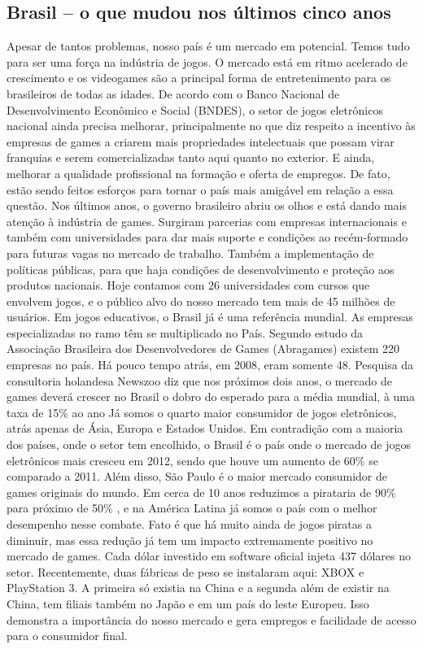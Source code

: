 \subsection{Brasil – o que mudou nos últimos cinco anos}
%
Apesar de tantos problemas, nosso país é um mercado em potencial. Temos tudo para ser uma força na indústria de jogos. O mercado está em ritmo acelerado de crescimento e os videogames são a principal forma de entretenimento para os brasileiros de todas as idades. De acordo com o Banco Nacional de Desenvolvimento Econômico e Social (BNDES), o setor de jogos eletrônicos nacional ainda precisa melhorar, principalmente no que diz respeito a incentivo às empresas de games a criarem mais propriedades intelectuais que possam virar franquias e serem comercializadas tanto aqui quanto no exterior. E ainda, melhorar a qualidade profissional na formação e oferta de empregos.
De fato, estão sendo feitos esforços para tornar o país mais amigável em relação a essa questão. Nos últimos anos, o governo brasileiro abriu os olhos e está dando mais atenção à indústria de games. Surgiram parcerias com empresas internacionais e também com universidades para dar mais suporte e condições ao recém-formado para futuras vagas no mercado de trabalho. Também a implementação de políticas públicas, para que haja condições de desenvolvimento e proteção aos produtos nacionais. Hoje contamos com 26 universidades com cursos que envolvem jogos, e o público alvo do nosso mercado tem mais de 45 milhões de usuários. Em jogos educativos, o Brasil já é uma referência mundial.
As empresas especializadas no ramo têm se multiplicado no País. Segundo estudo da Associação Brasileira dos Desenvolvedores de Games (Abragames) existem 220 empresas no país. Há pouco tempo atrás, em 2008, eram somente 48.
Pesquisa da consultoria holandesa Newszoo diz que nos próximos dois anos, o mercado de games deverá crescer no Brasil o dobro do esperado para a média mundial, à uma taxa de 15\% ao ano
Já somos o quarto maior consumidor de jogos eletrônicos, atrás apenas de Ásia, Europa e Estados Unidos. Em contradição com a maioria dos países, onde o setor tem encolhido, o Brasil é o país onde o mercado de jogos eletrônicos mais cresceu em 2012, sendo que houve um aumento de 60\% se comparado a 2011. Além disso, São Paulo é o maior mercado consumidor de games originais do mundo.
Em cerca de 10 anos reduzimos a pirataria de 90\% para próximo de 50\% , e na América Latina já somos o país com o melhor desempenho nesse combate. Fato é que há muito ainda de jogos piratas a diminuir, mas essa redução já tem um impacto extremamente positivo no mercado de games. Cada dólar investido em software oficial injeta 437 dólares no setor.
Recentemente, duas fábricas de peso se instalaram aqui: XBOX e PlayStation 3. A primeira só existia na China e a segunda além de existir na China, tem filiais também no Japão e em um país do leste Europeu. Isso demonstra a importância do nosso mercado e gera empregos e facilidade de acesso para o consumidor final.

